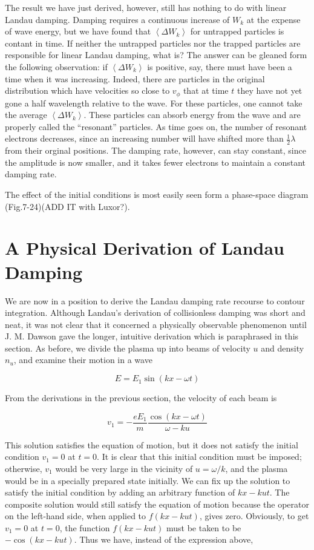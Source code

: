 \documentclass[
  notoc %
]{tufte-book}
\begin{document}
The result we have just derived, however, still has nothing to do with
linear Landau damping. Damping requires a continuous increase of \(W_k\)
at the expense of wave energy, but we have found that
\(\left<\Delta W_k\right>\) for untrapped particles is contant in time.
If neither the untrapped particles nor the trapped particles are
responsible for linear Landau damping, what is? The answer can be
gleaned form the following observation: if \(\left<\Delta W_k\right>\)
is positive, say, there must have been a time when it was increasing.
Indeed, there are particles in the original distribution which have
velocities so close to \(v_\phi\) that at time \(t\) they have not yet
gone a half wavelength relative to the wave. For these particles, one
cannot take the average \(\left<\Delta W_k\right>\). These particles can
absorb energy from the wave and are properly called the ``resonant''
particles. As time goes on, the number of resonant electrons decreases,
since an increasing number will have shifted more than
\(\frac{1}{2}\lambda\) from their orginal positions. The damping rate,
however, can stay constant, since the amplitude is now smaller, and it
takes fewer electrons to maintain a constant damping rate.

The effect of the initial conditions is most easily seen form a
phase-space diagram (Fig.7-24)(ADD IT with Luxor?).

\hypertarget{a-physical-derivation-of-landau-damping}{%
\section{A Physical Derivation of Landau
Damping}\label{a-physical-derivation-of-landau-damping}}

We are now in a position to derive the Landau damping rate recourse to
contour integration. Although Landau's derivation of collisionless
damping was short and neat, it was not clear that it concerned a
physically observable phenomenon until J. M. Dawson gave the longer,
intuitive derivation which is paraphrased in this section. As before, we
divide the plasma up into beams of velocity \(u\) and density \(n_u\),
and examine their motion in a wave

\[
E = E_1 \sin(kx-\omega t)
\]

From the derivations in the previous section, the velocity of each beam
is

\[
v_1 = -\frac{eE_1}{m}\frac{\cos(kx-\omega t)}{\omega-ku}
\]

This solution satisfies the equation of motion, but it does not satisfy
the initial condition \(v_1 = 0\) at \(t = 0\). It is clear that this
initial condition must be imposed; otherwise, \(v_1\) would be very
large in the vicinity of \(u=\omega/k\), and the plasma would be in a
specially prepared state initially. We can fix up the solution to
satisfy the initial condition by adding an arbitrary function of
\(kx-kut\). The composite solution would still satisfy the equation of
motion because the operator on the left-hand side, when applied to
\(f(kx-kut)\), gives zero. Obviously, to get \(v_1 = 0\) at \(t=0\), the
function \(f(kx-kut)\) must be taken to be \(-\cos(kx-kut)\). Thus we
have, instead of the expression above,
\end{document}
